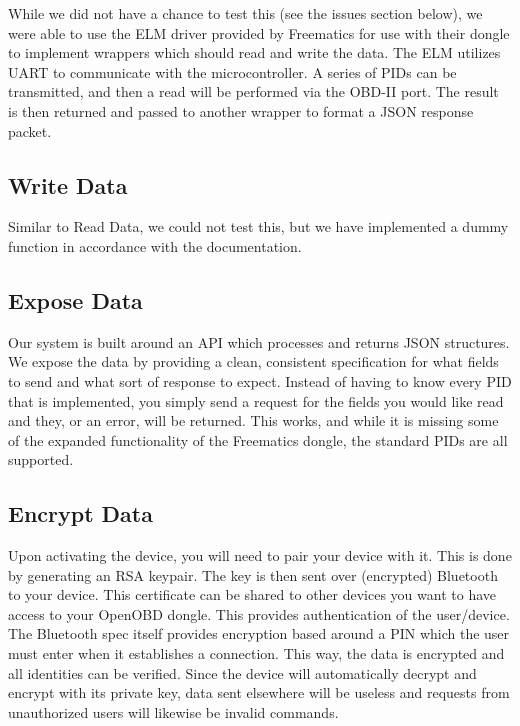 \documentclass[10pt,letterpaper,unboxed,cm]{article}
\begin{document}
While we did not have a chance to test this (see the issues section below), we were able to use the ELM driver provided by Freematics for use with their dongle to implement wrappers which should read and write the data. The ELM utilizes UART to communicate with the microcontroller. A series of PIDs can be transmitted, and then a read will be performed via the OBD-II port. The result is then returned and passed to another wrapper to format a JSON response packet.

\subsection{Write Data}

Similar to Read Data, we could not test this, but we have implemented a dummy function in accordance with the documentation.

\subsection{Expose Data}

Our system is built around an API which processes and returns JSON structures. We expose the data by providing a clean, consistent specification for what fields to send and what sort of response to expect. Instead of having to know every PID that is implemented, you simply send a request for the fields you would like read and they, or an error, will be returned. This works, and while it is missing some of the expanded functionality of the Freematics dongle, the standard PIDs are all supported.

\subsection{Encrypt Data}

Upon activating the device, you will need to pair your device with it. This is done by generating an RSA keypair. The  key is then sent over (encrypted) Bluetooth to your device. This certificate can be shared to other devices you want to have access to your OpenOBD dongle. This provides authentication of the user/device. The Bluetooth spec itself provides encryption based around a PIN which the user must enter when it establishes a connection. This way, the data is encrypted and all identities can be verified. Since the device will automatically decrypt and encrypt with its private key, data sent elsewhere will be useless and requests from unauthorized users will likewise be invalid commands.
\end{document}
